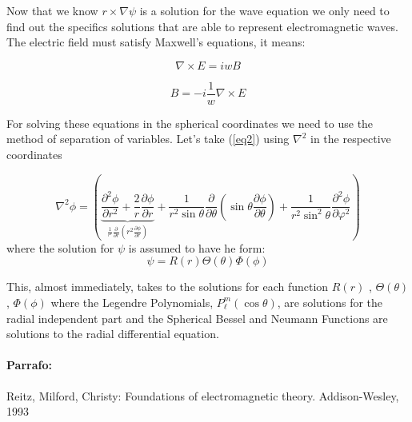 \documentclass[paper=a4, fontsize=11pt]{scrartcl} %
\numberwithin{equation}{section} %
\numberwithin{figure}{section} %
\numberwithin{table}{section} %
\begin{document}
Now that we know $r\times \nabla \psi$ is a solution for the wave equation we only need to find out the specifics solutions that are able to represent electromagnetic waves. The electric field must satisfy Maxwell's equations, it means:

\begin{equation}
\nabla \times E=iwB
\end{equation}

\begin{equation}
B=-i\frac{1}{w} \nabla \times E
\end{equation}

For solving these equations in the spherical coordinates we need to use the method of separation of variables. Let's take (\ref{eq2}) using $\nabla^2$ in the respective coordinates


\begin{equation}
\nabla ^2\phi = \left( {\underbrace {\frac{\partial ^2\phi }{\partial r^2} +
\frac{2}{r}\frac{\partial \phi }{\partial
r}}_{\frac{1}{^{r^2}}\frac{\partial }{\partial r}\left( {r^2\frac{\partial
\phi }{\partial r}} \right)} + \frac{1}{r^2\sin \theta }\frac{\partial
}{\partial \theta }\left( {\sin \theta \frac{\partial \phi }{\partial \theta
}} \right) + \frac{1}{r^2\sin ^2\theta }\frac{\partial ^2\phi }{\partial
\varphi ^2}} \right)
\end{equation}
where the solution for $\psi$ is assumed to have he form:
\begin{equation}
\psi=R(r)\Theta(\theta) \Phi(\phi)
\end{equation}

This, almost immediately, takes to the solutions for each function $R(r)$ , $\Theta(\theta)$ , $\Phi(\phi)$ where the Legendre Polynomials, $P_{\ell}^{m}\left(\cos\theta\right)$, are solutions for the radial independent part and the Spherical Bessel and Neumann Functions are solutions to the radial differential equation.


\paragraph*{Parrafo:}



\begin{thebibliography}{2}
 Reitz, Milford, Christy: Foundations of electromagnetic theory. Addison-Wesley, 1993

\end{thebibliography}
\end{document}
